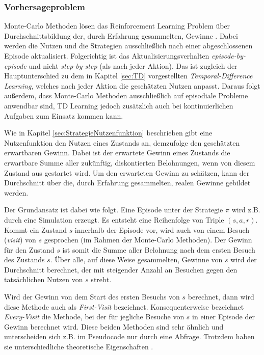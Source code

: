 \subsubsection{Vorhersageproblem}
Monte-Carlo Methoden lösen das Reinforcement Learning Problem über Durchschnittsbildung der, durch Erfahrung gesammelten, Gewinne \cite[S.~91]{Sutton1998}. Dabei werden die Nutzen und die Strategien ausschließlich nach einer abgeschlossenen Episode aktualisiert. Folgerichtig ist das Aktualisierungsverhalten \textit{episode-by-episode} und nicht \textit{step-by-step} (als nach jeder Aktion)\cite[S.~91]{Sutton1998}. Das ist zugleich der Hauptunterschied zu dem in Kapitel \ref{sec:TD} vorgestellten \textit{Temporal-Difference Learning}, welches nach jeder Aktion die geschätzten Nutzen anpasst. Daraus folgt außerdem, dass Monte-Carlo Methoden ausschließlich auf episodiale Probleme anwendbar sind, TD Learning jedoch zusätzlich auch bei kontinuierlichen Aufgaben zum Einsatz kommen kann. 
\par
Wie in Kapitel \ref{sec:StrategieNutzenfunktion} beschrieben gibt eine Nutzenfunktion den Nutzen eines Zustands an, demzufolge den geschätzten erwartbaren Gewinn. Dabei ist der erwartete Gewinn eines Zustands die erwartbare Summe aller zukünftig, diskontierten Belohnungen, wenn von diesem Zustand aus gestartet wird. Um den erwarteten Gewinn zu schätzen, kann der Durchschnitt über die, durch Erfahrung gesammelten, realen Gewinne gebildet werden.
\par 
Der Grundansatz ist dabei wie folgt. Eine Episode unter der Strategie $\pi$ wird z.B. durch eine Simulation erzeugt. Es entsteht eine Reihenfolge von Triple $(s,a,r)$. Kommt ein Zustand $s$ innerhalb der Episode vor, wird auch von einem Besuch (\textit{visit}) von $s$ gesprochen (im Rahmen der Monte-Carlo Methoden). Der Gewinn für den Zustand $s$ ist somit die Summe aller Belohnung nach dem ersten Besuch des Zustands $s$. Über alle, auf diese Weise gesammelten, Gewinne von $s$ wird der Durchschnitt berechnet, der mit steigender Anzahl an Besuchen gegen den tatsächlichen Nutzen von $s$ strebt.
\par 
Wird der Gewinn von dem Start des ersten Besuchs von $s$ berechnet, dann wird diese Methode auch als \textit{First-Visit} bezeichnet. Konsequenterweise bezeichnet \textit{Every-Visit} die Methode, bei der für jegliche Besuche von $s$ in einer Episode der Gewinn berechnet wird. Diese beiden Methoden sind sehr ähnlich und unterscheiden sich z.B. im Pseudocode nur durch eine Abfrage. Trotzdem haben sie unterschiedliche theoretische Eigenschaften \cite[S.~92]{Sutton1998}.
